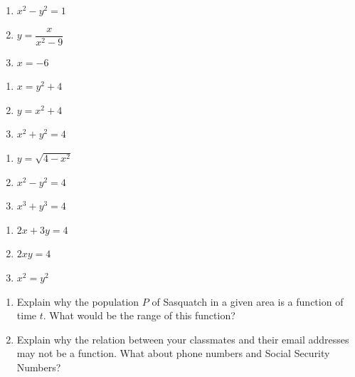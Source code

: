 \begin{multicols}{3}
\begin{enumerate}
\setcounter{enumi}{\value{HW}}

\item $x^{2} - y^{2} = 1$
\item $y = \dfrac{x}{x^{2} - 9}$
\item $x = -6$

\setcounter{HW}{\value{enumi}}
\end{enumerate}
\end{multicols}

\begin{multicols}{3}
\begin{enumerate}
\setcounter{enumi}{\value{HW}}

\item  $x = y^2 + 4$

\item $y = x^2 + 4$
\item $x^2 + y^2 = 4$

\setcounter{HW}{\value{enumi}}
\end{enumerate}
\end{multicols}

\begin{multicols}{3}
\begin{enumerate}
\setcounter{enumi}{\value{HW}}


\item $y = \sqrt{4-x^2}$
\item $x^2 - y^2 = 4$
\item $x^3 + y^3 = 4$


\setcounter{HW}{\value{enumi}}
\end{enumerate}
\end{multicols}

\begin{multicols}{3}
\begin{enumerate}
\setcounter{enumi}{\value{HW}}

\item $2x + 3y = 4$
\item $2xy = 4$
\item $x^2 = y^2$ \label{equfunctionlast}

\setcounter{HW}{\value{enumi}}
\end{enumerate}
\end{multicols}

\begin{enumerate}
\setcounter{enumi}{\value{HW}}

\item Explain why the population $P$ of Sasquatch in a given area is a function of time $t$.  What would be the range of this function?

\item Explain why the relation between your classmates and their email addresses may not be a function.  What about phone numbers and Social Security Numbers?

\setcounter{HW}{\value{enumi}}
\end{enumerate}

